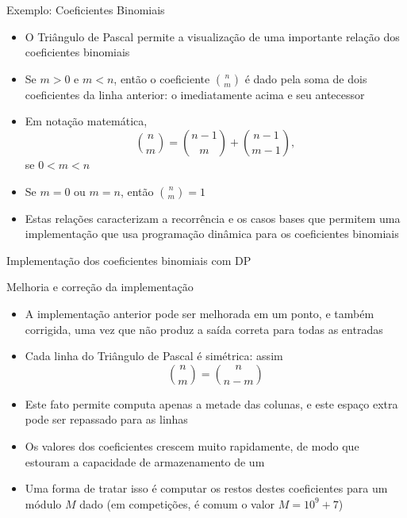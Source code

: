 \begin{frame}[fragile]{Exemplo: Coeficientes Binomiais}

    \begin{itemize}
        \item O Triângulo de Pascal permite a visualização de uma importante relação dos
            coeficientes binomiais
        \pause

        \item Se $m > 0$ e $m < n$, então o coeficiente $\binom{n}{m}$ é dado pela soma de
            dois coeficientes da linha anterior: o imediatamente acima e seu antecessor
        \pause

        \item Em notação matemática,
        \[
            \binom{n}{m} = \binom{n - 1}{m} + \binom{n - 1}{m - 1},
        \]
        se $0 < m < n$
        \pause

        \item Se $m = 0$ ou $m = n$, então $\binom{n}{m} = 1$
        \pause

        \item Estas relações caracterizam a recorrência e os casos bases que permitem uma
            implementação que usa programação dinâmica para os coeficientes binomiais
    \end{itemize}

\end{frame}

\begin{frame}[fragile]{Implementação dos coeficientes binomiais com DP}
\end{frame}

\begin{frame}[fragile]{Melhoria e correção da implementação}

    \begin{itemize}
        \item A implementação anterior pode ser melhorada em um ponto, e também corrigida,
            uma vez que não produz a saída correta para todas as entradas
        \pause

        \item Cada linha do Triângulo de Pascal é simétrica: assim
        \[
            \binom{n}{m} = \binom{n}{n - m}
        \]
        \pause

        \item Este fato permite computa apenas a metade das colunas, e este espaço extra pode
            ser repassado para as linhas
        \pause

        \item Os valores dos coeficientes crescem muito rapidamente, de modo que estouram a
            capacidade de armazenamento de um 
        \pause

        \item Uma forma de tratar isso é computar os restos destes coeficientes para um módulo
            $M$ dado (em competições, é comum o valor $M = 10^9 + 7$)
    \end{itemize}

\end{frame}

